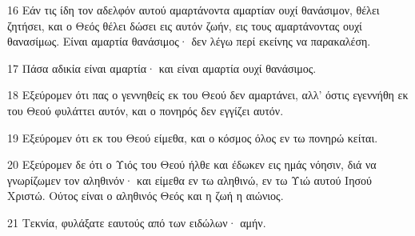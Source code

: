 \par 16 Εάν τις ίδη τον αδελφόν αυτού αμαρτάνοντα αμαρτίαν ουχί θανάσιμον, θέλει ζητήσει, και ο Θεός θέλει δώσει εις αυτόν ζωήν, εις τους αμαρτάνοντας ουχί θανασίμως. Είναι αμαρτία θανάσιμος· δεν λέγω περί εκείνης να παρακαλέση.
\par 17 Πάσα αδικία είναι αμαρτία· και είναι αμαρτία ουχί θανάσιμος.
\par 18 Εξεύρομεν ότι πας ο γεννηθείς εκ του Θεού δεν αμαρτάνει, αλλ' όστις εγεννήθη εκ του Θεού φυλάττει αυτόν, και ο πονηρός δεν εγγίζει αυτόν.
\par 19 Εξεύρομεν ότι εκ του Θεού είμεθα, και ο κόσμος όλος εν τω πονηρώ κείται.
\par 20 Εξεύρομεν δε ότι ο Υιός του Θεού ήλθε και έδωκεν εις ημάς νόησιν, διά να γνωρίζωμεν τον αληθινόν· και είμεθα εν τω αληθινώ, εν τω Υιώ αυτού Ιησού Χριστώ. Ούτος είναι ο αληθινός Θεός και η ζωή η αιώνιος.
\par 21 Τεκνία, φυλάξατε εαυτούς από των ειδώλων· αμήν.


